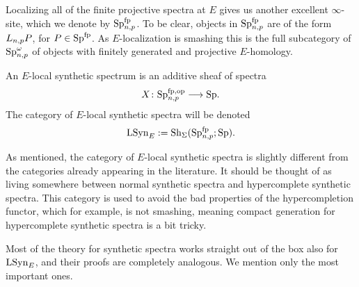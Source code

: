 Localizing all of the finite projective spectra at $E$ gives us another excellent $\infty$-site, which we denote by $\mathrm{Sp}_{n,p}^{\mathrm{fp}}$. To be clear, objects in $\mathrm{Sp}_{n,p}^{\mathrm{fp}}$ are of the form $L_{n,p} P$, for $P\in \mathrm{Sp}^{\mathrm{fp}}$. As $E$-localization is smashing this is the full subcategory of $\mathrm{Sp}_{n,p}^\omega$ of objects with finitely generated and projective $E$-homology.  

\begin{definition}
    An $E$-local synthetic spectrum is an additive sheaf of spectra 
    \[X\colon \mathrm{Sp}_{n,p}^{\mathrm{fp}, \mathrm{op}}\longrightarrow \mathrm{Sp}.\] 
    The category of $E$-local synthetic spectra will be denoted 
    \[\mathrm{LSyn}_{E} := \mathrm{Sh}_\Sigma(\mathrm{Sp}_{n,p}^{\mathrm{fp}};\mathrm{Sp}).\]
\end{definition}

\begin{remark}
    As mentioned, the category of $E$-local synthetic spectra is slightly different from the categories already appearing in the literature. It should be thought of as living somewhere between normal synthetic spectra and hypercomplete synthetic spectra. This category is used to avoid the bad properties of the hypercompletion functor, which for example, is not smashing, meaning compact generation for hypercomplete synthetic spectra is a bit tricky. 
\end{remark}


Most of the theory for synthetic spectra works straight out of the box also for $\mathrm{LSyn}_{E}$, and their proofs are completely analogous. We mention only the most important ones.  

